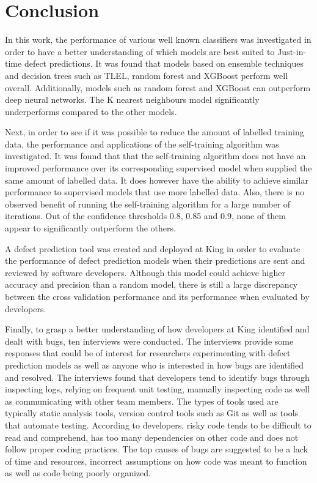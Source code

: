 \documentclass[../main.tex]{subfiles}
\begin{document}
\chapter{Conclusion}

In this work, the performance of various well known classifiers was investigated in order to have a better understanding of which models are best suited to Just-in-time defect predictions. It was found that models based on ensemble techniques and decision trees such as TLEL, random forest and XGBoost perform well overall. Additionally, models such as random forest and XGBoost can outperform deep neural networks. The K nearest neighbours model significantly underperforms compared to the other models. 

Next, in order to see if it was possible to reduce the amount of labelled training data, the performance and applications of the self-training algorithm was investigated. It was found that that the self-training algorithm does not have an improved performance over its corresponding supervised model when supplied the same amount of labelled data. It does however have the ability to achieve similar performance to supervised models that use more labelled data. Also, there is no observed benefit of running the self-training algorithm for a large number of iterations. Out of the confidence thresholds 0.8, 0.85 and 0.9, none of them appear to significantly outperform the others.

A defect prediction tool was created and deployed at King in order to evaluate the performance of defect prediction models when their predictions are sent and reviewed by software developers. Although this model could achieve higher accuracy and precision than a random model, there is still a large discrepancy between the cross validation performance and its performance when evaluated by developers.

Finally, to grasp a better understanding of how developers at King identified and dealt with bugs, ten interviews were conducted. The interviews provide some responses that could be of interest for researchers experimenting with defect prediction models as well as anyone who is interested in how bugs are identified and resolved. The interviews found that developers tend to identify bugs through inspecting logs, relying on frequent unit testing, manually inspecting code as well as communicating with other team members. The types of tools used are typically static analysis tools, version control tools such as Git as well as tools that automate testing. According to developers, risky code tends to be difficult to read and comprehend, has too many dependencies on other code and does not follow proper coding practices. The top causes of bugs are suggested to be a lack of time and resources, incorrect assumptions on how code was meant to function as well as code being poorly organized. 
\end{document}
